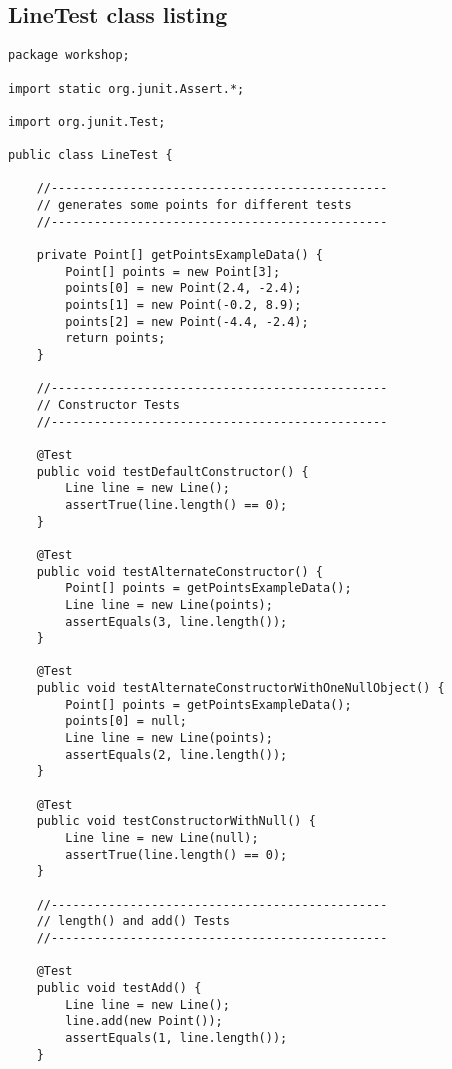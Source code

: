 \pagebreak
\subsection{LineTest class listing}
\label{subsec: line-class-listing}

\begin{lstlisting}
package workshop;

import static org.junit.Assert.*;

import org.junit.Test;

public class LineTest {
	
	//-----------------------------------------------
	// generates some points for different tests
	//-----------------------------------------------
	
	private Point[] getPointsExampleData() {
		Point[] points = new Point[3];
		points[0] = new Point(2.4, -2.4);
		points[1] = new Point(-0.2, 8.9);
		points[2] = new Point(-4.4, -2.4);
		return points;
	}
	
	//-----------------------------------------------
	// Constructor Tests
	//-----------------------------------------------
	
	@Test
	public void testDefaultConstructor() {
		Line line = new Line();
		assertTrue(line.length() == 0);
	}
	
	@Test
	public void testAlternateConstructor() {
		Point[] points = getPointsExampleData();
		Line line = new Line(points);
		assertEquals(3, line.length());
	}
	
	@Test
	public void testAlternateConstructorWithOneNullObject() {
		Point[] points = getPointsExampleData();
		points[0] = null;
		Line line = new Line(points);
		assertEquals(2, line.length());
	}
	
	@Test
	public void testConstructorWithNull() {
		Line line = new Line(null);
		assertTrue(line.length() == 0);
	}
	
	//-----------------------------------------------
	// length() and add() Tests
	//-----------------------------------------------
	
	@Test
	public void testAdd() {
		Line line = new Line();
		line.add(new Point());
		assertEquals(1, line.length());
	}
	

\end{lstlisting}
